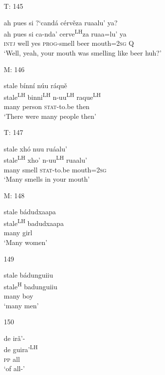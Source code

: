 \begin{itemize}
\item[T: 145]
 
\glll   ah pues si {?`}cand\'{a} c\'{e}rv\v{e}za ruaalu' ya?\\
ah pues si ca-nda'  cerve\textsuperscript{LH}za ruaa=lu' ya\\
\textsc{intj} well yes \textsc{prog}-smell  beer mouth=\textsc{2sg} \textsc{Q}\\
\glt `Well, yeah, your mouth was smelling like beer huh?'
 


\item[M: 146]
 
\glll   stale b\'{i}nn\'{i} n\'{u}u r\'{a}qu\v{e}\\
stale\textsuperscript{LH} binni\textsuperscript{LH} n-uu\textsuperscript{LH} raque\textsuperscript{LH}\\
many person \textsc{stat}-to.be then\\
\glt `There were many people then'
 

\item[T: 147]
  
\glll   stale xh\'{o} nuu ru\'{a}alu'\\
stale\textsuperscript{LH}  xho' n-uu\textsuperscript{LH} ruaalu'\\
many smell \textsc{stat}-to.be mouth=\textsc{2sg}\\
\glt `Many smells in your mouth'
 


\item[M: 148]
 
\glll   stale b\'{a}dudxaapa\\
stale\textsuperscript{LH} badudxaapa\\
many girl\\
\glt `Many women'
 


\item[149]
 
\glll   stale b\'{a}dunguiiu\\
stale\textsuperscript{H} badunguiiu\\
many boy\\
\glt `many men'
 


\item[150]
 
\glll   de ir\v{a}'-\\
de guira'\textsuperscript{LH}\\
\textsc{pp} all\\
\glt `of all-' 
 




\end{itemize}
